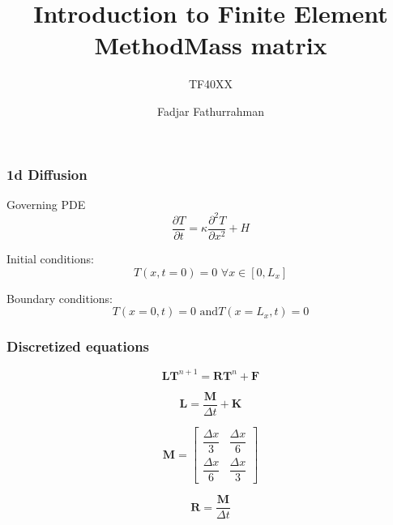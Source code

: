 



\title{Introduction to Finite Element Method}
\subtitle{TF40XX}
\author{Fadjar Fathurrahman}
\date{}


\frame{\titlepage}


\begin{frame} %
\frametitle{1d Diffusion}

Governing PDE
\begin{equation*}
\frac{\partial T}{\partial t} = \kappa \frac{\partial^2 T}{\partial x^2} + H
\end{equation*}

Initial conditions:
\begin{equation*}
T(x,t=0) = 0 \,\, \forall x \in [0,L_{x}]
\end{equation*}

Boundary conditions:
\begin{equation*}
T(x=0,t) = 0 \,\,\text{and} T(x=L_{x},t) = 0
\end{equation*}

\end{frame} %



\begin{frame} %
\frametitle{Discretized equations}

\begin{equation*}
\mathbf{L} \mathbf{T}^{n+1} = \mathbf{R} \mathbf{T}^{n} + \mathbf{F}
\end{equation*}

\begin{equation*}
\mathbf{L} = \frac{\mathbf{M}}{\Delta t} + \mathbf{K}
\end{equation*}

\end{frame}


\begin{frame} %
\title{Mass matrix}

\begin{equation*}
\mathbf{M} = \begin{bmatrix}
\dfrac{\Delta x}{3} & \dfrac{\Delta x}{6} \\
\dfrac{\Delta x}{6} & \dfrac{\Delta x}{3}
\end{bmatrix}
\end{equation*}

\begin{equation*}
\mathbf{R} = \frac{\mathbf{M}}{\Delta t}
\end{equation*}

\end{frame}


